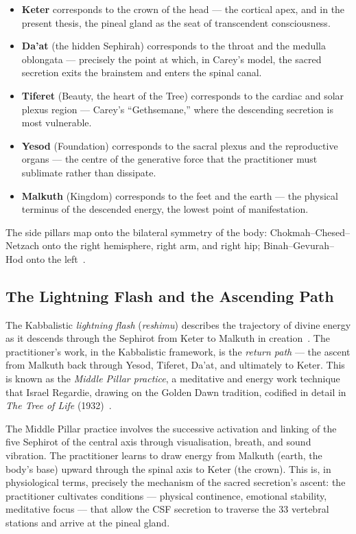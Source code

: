 \documentclass[12pt, a4paper]{article}
\begin{document}
\begin{itemize}
  \item \textbf{Keter} corresponds to the crown of the head — the cortical
  apex, and in the present thesis, the pineal gland as the seat of
  transcendent consciousness.
  \item \textbf{Da'at} (the hidden Sephirah) corresponds to the throat and
  the medulla oblongata — precisely the point at which, in Carey's model, the
  sacred secretion exits the brainstem and enters the spinal canal.
  \item \textbf{Tiferet} (Beauty, the heart of the Tree) corresponds to the
  cardiac and solar plexus region — Carey's ``Gethsemane,'' where the
  descending secretion is most vulnerable.
  \item \textbf{Yesod} (Foundation) corresponds to the sacral plexus and the
  reproductive organs — the centre of the generative force that the practitioner
  must sublimate rather than dissipate.
  \item \textbf{Malkuth} (Kingdom) corresponds to the feet and the earth —
  the physical terminus of the descended energy, the lowest point of
  manifestation.
\end{itemize}

The side pillars map onto the bilateral symmetry of the body: Chokmah--Chesed--Netzach
onto the right hemisphere, right arm, and right hip; Binah--Gevurah--Hod onto
the left~\autocite[87]{fortune1935}.

\subsection{The Lightning Flash and the Ascending Path}

The Kabbalistic \emph{lightning flash} (\emph{reshimu}) describes the
trajectory of divine energy as it descends through the Sephirot from Keter to
Malkuth in creation~\autocite[120]{scholem1941}. The practitioner's work, in
the Kabbalistic framework, is the \emph{return path} — the ascent from
Malkuth back through Yesod, Tiferet, Da'at, and ultimately to Keter. This
is known as the \emph{Middle Pillar practice}, a meditative and energy work
technique that Israel Regardie, drawing on the Golden Dawn tradition,
codified in detail in \emph{The Tree of Life} (1932)~\autocite{regardie1932}.

The Middle Pillar practice involves the successive activation and linking of
the five Sephirot of the central axis through visualisation, breath, and
sound vibration. The practitioner learns to draw energy from Malkuth
(earth, the body's base) upward through the spinal axis to Keter (the
crown). This is, in physiological terms, precisely the mechanism of the
sacred secretion's ascent: the practitioner cultivates conditions — physical
continence, emotional stability, meditative focus — that allow the CSF
secretion to traverse the 33 vertebral stations and arrive at the pineal gland.
\end{document}

